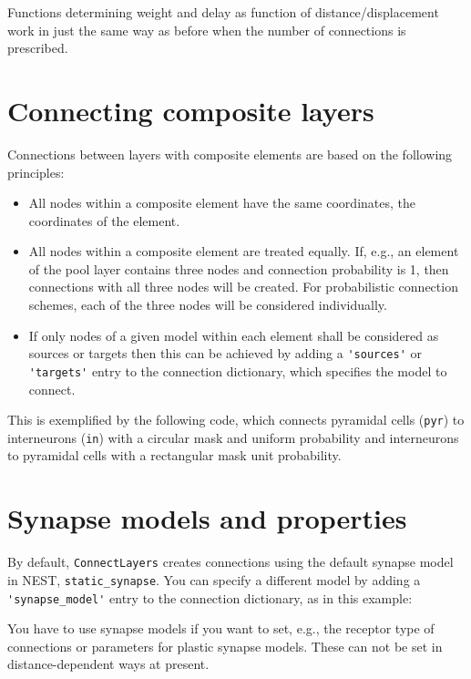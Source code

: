 \documentclass[a4paper,12pt]{report}
\begin{document}
Functions determining weight and delay as function of
distance/displacement work in just the same way as before when the
number of connections is prescribed.

\section{Connecting composite layers}\label{sec:conn_composite}

Connections between layers with composite elements are based on the
following principles:
\begin{itemize}
\item All nodes within a composite element have the same
  coordinates, the coordinates of the element.
\item All nodes within a composite element are treated equally. If,
  e.g., an element of the pool layer contains three nodes and
  connection probability is 1, then connections with all three nodes
  will be created. For probabilistic connection schemes, each of the
  three nodes will be considered individually.
\item If only nodes of a given model within each element
  shall be considered as sources or targets then this can be achieved
  by adding a \lstinline!'sources'! or \lstinline!'targets'! entry to
  the connection dictionary, which specifies the model to connect.
\end{itemize}
This is exemplified by the following code, which connects pyramidal
cells (\lstinline!pyr!) to interneurons (\lstinline!in!) with a
circular mask and uniform probability and interneurons to pyramidal
cells with a rectangular mask unit probability.



\section{Synapse models and properties}\label{sec:conn_synapse}

By default, \lstinline!ConnectLayers! creates connections using the
default synapse model in NEST,
\lstinline!static_synapse!. You can specify a different model by
adding a \lstinline!'synapse_model'! entry to the connection
dictionary, as in this example:

You have to use synapse models if you want to set, e.g., the receptor
type of connections or parameters for plastic synapse models. These
can not be set in distance-dependent ways at present.
\end{document}
